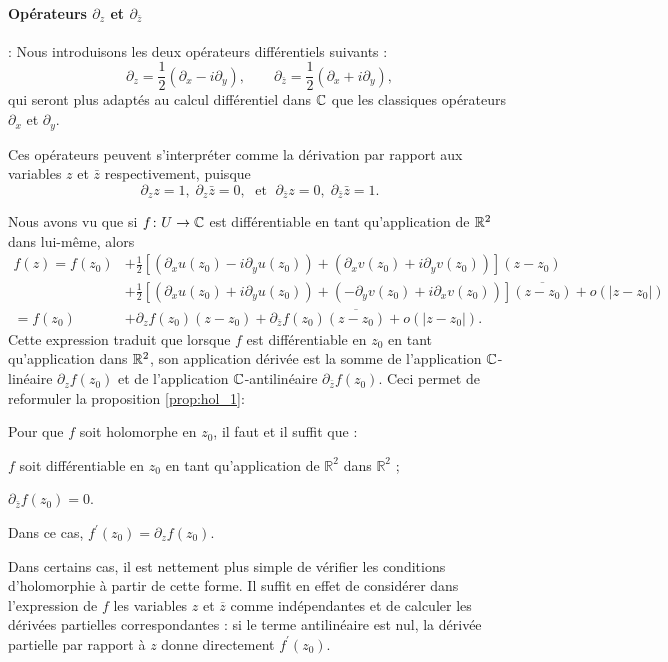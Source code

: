 \paragraph{Opérateurs $\partial_z$ et $\partial_{\bar{z}}$} :  Nous introduisons les deux opérateurs différentiels suivants :
\[\partial_z = \frac{1}{2} \left(\partial_x -i \partial_y \right), \qquad \partial_{\bar{z}} = \frac{1}{2} \left(\partial_x + i \partial_y \right),\]
qui seront plus adaptés au calcul différentiel dans $\mathbb{C}$ que les classiques opérateurs $\partial_x$ et $\partial_y$. 

Ces opérateurs peuvent s'interpréter comme la dérivation par rapport aux variables $z$ et $\bar{z}$ respectivement, puisque 
\[\partial_z z=1, \; \partial_z \bar{z}=0, \; \text{ et } \;  \partial_{\bar{z}} z=0, \;\partial_{\bar{z}}\bar{z}=1.\]

Nous avons vu que si $f \colon U \to \mathbb{C}$ est différentiable en tant qu'application de $\mathbb R^2$ dans lui-même, alors
\begin{align*}
f(z)  = f(z_0) &+ \frac{1}{2} \left[(\partial_x u(z_0)-i \partial_y u(z_0)) + (\partial_x v(z_0) + i \partial_y v(z_0))\right](z-z_0) \\  &+  \frac{1}{2} \left[(\partial_x u(z_0) + i \partial_y u(z_0)) + (- \partial_y v(z_0) + i \partial_x v(z_0))\right]\overline{(z-z_0)} + o(\lvert z-z_0 \rvert) \\
=f(z_0) &+ \partial_z f(z_0) (z-z_0) + \partial_{\bar{z}} f(z_0) \overline{(z-z_0)} + o(\lvert z-z_0 \rvert).
\end{align*}
Cette expression traduit que lorsque $f$ est différentiable en $z_0$ en tant qu'application dans $\mathbb R^2$, son application dérivée est la somme de l'application $\mathbb{C}$-linéaire $\partial_z f(z_0)$ et de l'application $\mathbb{C}$-antilinéaire $ \partial_{\bar{z}} f(z_0)$. Ceci permet de reformuler la proposition \ref{prop:hol_1}:
\begin{fprop}
Pour que $f$ soit holomorphe en $z_0$, il faut et il suffit que :
\begin{MYenumerate}
\item $f$ soit différentiable en $z_0$ en tant qu'application de $\mathbb{R}^2$ dans $\mathbb{R}^2$ ;
\item $ \partial_{\bar{z}}f(z_0)=0$.
\end{MYenumerate}
Dans ce cas, $f^\prime(z_0)=\partial_z f(z_0)$.
\end{fprop}

Dans certains cas, il est nettement
plus simple de vérifier les conditions d'holomorphie à partir de cette forme. Il
suffit en effet de considérer dans l'expression de $f$ les variables
$z$ et $\overline{z}$ comme indépendantes et de calculer les dérivées partielles
correspondantes : si le terme antilinéaire est nul, la dérivée partielle par
rapport à $z$ donne directement $f^\prime(z_0)$.

